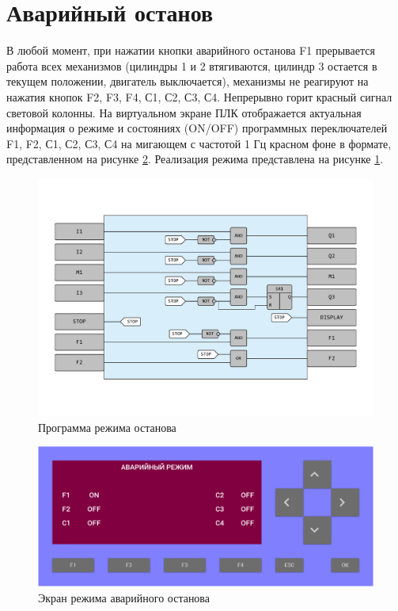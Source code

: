 \section{Аварийный останов}
В любой момент, при нажатии кнопки аварийного останова F1 прерывается
работа всех механизмов (цилиндры 1 и 2 втягиваются, цилиндр 3 остается в
текущем положении, двигатель выключается), механизмы не реагируют на
нажатия кнопок F2, F3, F4, С1, С2, С3, С4. Непрерывно горит красный
сигнал световой колонны. На виртуальном экране ПЛК отображается
актуальная информация о режиме и состояниях (ON/OFF) программных
переключателей F1, F2, С1, С2, С3, С4 на мигающем с частотой 1 Гц
красном фоне в формате, представленном на рисунке \ref{fig:alert_screen}.
Реализация режима представлена на рисунке \ref{fig:alert_mode}.
\begin{figure}[pt]
    \centering
    \includegraphics[width=1\textwidth]{fig/alert.pdf}
    \caption{Программа режима останова}
    \label{fig:alert_mode}
\end{figure}

\begin{figure}[pb]
    \centering
    \includegraphics[width=1\textwidth]{fig/alert_panel.png}
    \caption{Экран режима аварийного останова}
    \label{fig:alert_screen}
\end{figure}



